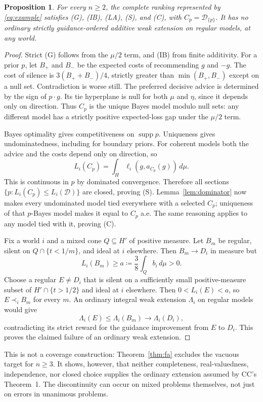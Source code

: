 \documentclass[11pt]{article}
\newtheorem{proposition}[theorem]{Proposition}
\theoremstyle{remark}\newtheorem{remark}[theorem]{Remark}
\newcommand{\Dscr}{\mathcal D}
\newcommand{\supp}{\operatorname{supp}}
\begin{document}
\begin{proposition}\label{prop:example}
For every $n\ge2$, the complete ranking represented by \eqref{eq:example}
satisfies (G), (IB), (LA), (S), and (C), with
$C_p=\Dscr_{\{p\}}$. It has no ordinary strictly guidance-ordered additive
weak extension on regular models, at any world.
\end{proposition}
\begin{proof}
Strict (G) follows from the $\mu/2$ term, and (IB) from finite additivity.
For a prior $p$, let $B_+$ and $B_-$ be the expected costs of recommending
$g$ and $-g$. The cost of silence is
$3(B_++B_-)/4$, strictly greater than $\min(B_+,B_-)$ except on a null set.
Contradiction is worse still. The preferred decisive advice is determined
by the sign of $p\cdot g$. Its tie hyperplane is null for both $\mu$ and
$\eta$, since it depends only on direction. Thus $C_p$ is the unique Bayes
model modulo null sets: any different model has a strictly positive
expected-loss gap under the $\mu/2$ term.

Bayes optimality gives competitiveness on $\supp p$. Uniqueness gives
undominatedness, including for boundary priors. For coherent models
both the advice and the costs depend only on direction, so
\[
 L_i(C_p)=\int_H\ell_i(g,a_{C_p}(g))\,d\mu.
\]
This is continuous in $p$ by dominated convergence. Therefore all sections
$\{p:L_i(C_p)\le L_i(\Dscr)\}$ are closed, proving (S).
Lemma~\ref{lem:dominator} now makes every undominated model tied everywhere
with a selected $C_p$; uniqueness of that $p$-Bayes model makes it equal to
$C_p$ a.e. The same reasoning applies to any model tied with it, proving (C).

Fix a world $i$ and a mixed cone $Q\subseteq H'$ of positive measure.
Let $B_m$ be regular, silent on $Q\cap\{t<1/m\}$, and ideal at $i$
elsewhere. Then $B_m\to D_i$ in measure but
\[
 L_i(B_m)\ge a\coloneqq\frac38\int_Q b_i\,d\mu>0.
\]
Choose a regular $E\ne D_i$ that is silent on a sufficiently small
positive-measure subset of $H'\cap\{t>1/2\}$ and ideal at $i$ elsewhere.
Then $0<L_i(E)<a$, so $E\prec_i B_m$ for every $m$.
An ordinary integral weak extension $\Lambda_i$ on regular models would
give
\[
 \Lambda_i(E)\le\Lambda_i(B_m)\longrightarrow\Lambda_i(D_i),
\]
contradicting its strict reward for the guidance improvement from $E$ to
$D_i$. This proves the claimed failure of an ordinary weak extension.
\end{proof}

This is not a coverage construction: Theorem~\ref{thm:fa} excludes the
vacuous target for $n\ge3$. It shows, however, that neither completeness,
real-valuedness, independence, nor closed choice supplies the ordinary
extension assumed by CC's Theorem~1. The discontinuity can occur on mixed
problems themselves, not just on errors in unanimous problems.
\end{document}
